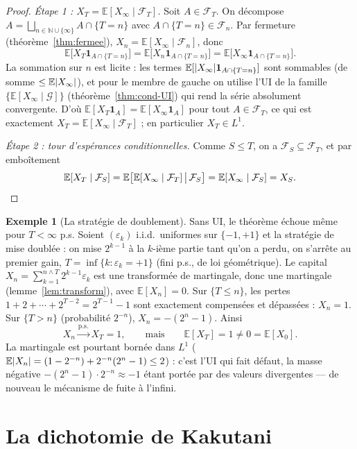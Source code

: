 \documentclass[11pt,a4paper]{article}
\theoremstyle{plain}
\theoremstyle{definition}
\newtheorem{example}[theorem]{Exemple}
\theoremstyle{remark}
\newcommand{\E}{\mathbb{E}}
\newcommand{\N}{\mathbb{N}}
\newcommand{\F}{\mathcal{F}}
\newcommand{\G}{\mathcal{G}}
\newcommand{\ps}{\text{p.s.}}
\newcommand{\ind}{\mathbf{1}}
\DeclarePairedDelimiter{\abs}{\lvert}{\rvert}
\begin{document}
\begin{proof}
\emph{Étape 1 : $X_T = \E[X_\infty \mid \F_T]$.} Soit $A \in \F_T$. On
décompose $A = \bigsqcup_{n \in \N \cup \{\infty\}} A \cap \{T = n\}$ avec
$A \cap \{T=n\} \in \F_n$. Par fermeture
(théorème~\ref{thm:fermee}), $X_n = \E[X_\infty \mid \F_n]$, donc
\[
\E\bigl[X_T \ind_{A \cap \{T=n\}}\bigr]
= \E\bigl[X_n \ind_{A \cap \{T=n\}}\bigr]
= \E\bigl[X_\infty \ind_{A \cap \{T=n\}}\bigr].
\]
La sommation sur $n$ est licite : les termes
$\E[\abs{X_\infty}\ind_{A\cap\{T=n\}}]$ sont sommables (de somme
$\le \E\abs{X_\infty}$), et pour le membre de gauche on utilise l'UI de la
famille $\{\E[X_\infty\mid\G]\}$ (théorème~\ref{thm:cond-UI}) qui rend la série
absolument convergente. D'où $\E[X_T\ind_A] = \E[X_\infty\ind_A]$ pour tout
$A \in \F_T$, ce qui est exactement $X_T = \E[X_\infty\mid\F_T]$ ; en
particulier $X_T \in L^1$.

\emph{Étape 2 : tour d'espérances conditionnelles.} Comme $S \le T$, on a
$\F_S \subseteq \F_T$, et par emboîtement
\[
\E[X_T \mid \F_S] = \E\bigl[\E[X_\infty \mid \F_T] \,\big|\, \F_S\bigr]
= \E[X_\infty \mid \F_S] = X_S. \qedhere
\]
\end{proof}

\begin{example}[La stratégie de doublement]\label{ex:doubling}
Sans UI, le théorème échoue même pour $T < \infty$ p.s. Soient $(\varepsilon_k)$
i.i.d.\ uniformes sur $\{-1,+1\}$ et la stratégie de mise doublée : on mise
$2^{k-1}$ à la $k$-ième partie tant qu'on a perdu, on s'arrête au premier gain,
$T = \inf\{k : \varepsilon_k = +1\}$ (fini p.s., de loi géométrique). Le
capital $X_n = \sum_{k=1}^{n \wedge T} 2^{k-1}\varepsilon_k$ est une
transformée de martingale, donc une martingale (lemme~\ref{lem:transform}),
avec $\E[X_n] = 0$. Sur $\{T \le n\}$, les pertes $1 + 2 + \cdots + 2^{T-2} =
2^{T-1} - 1$ sont exactement compensées et dépassées : $X_n = 1$. Sur
$\{T > n\}$ (probabilité $2^{-n}$), $X_n = -(2^n - 1)$. Ainsi
\[
X_n \xrightarrow{\ps} X_T = 1, \qquad \text{mais} \qquad
\E[X_T] = 1 \ne 0 = \E[X_0].
\]
La martingale est pourtant bornée dans $L^1$
($\E\abs{X_n} = (1 - 2^{-n}) + 2^{-n}(2^n - 1) \le 2$) : c'est l'UI qui fait
défaut, la masse négative $-(2^n-1) \cdot 2^{-n} \approx -1$ étant portée par
des valeurs divergentes --- de nouveau le mécanisme de fuite à l'infini.
\end{example}

\section{La dichotomie de Kakutani}\label{sec:kakutani}
\end{document}
